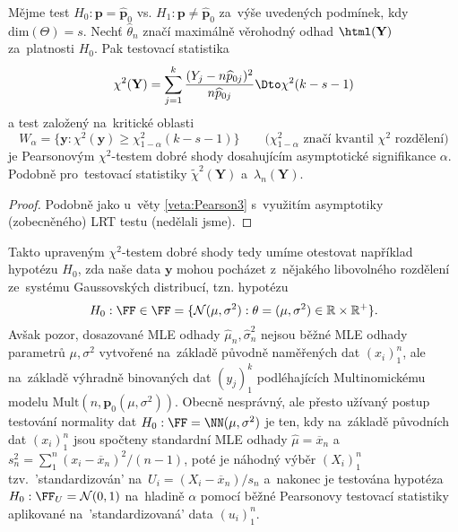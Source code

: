 \begin{theorem}
	Mějme test $ H_0: \mathbf p = \widehat{\mathbf p}_0$ vs. $H_1: \mathbf p \neq \widehat{\mathbf p}_0$ za~výše uvedených podmínek, kdy $\mathrm{dim}(\Theta)=s$. Nechť $\widehat\theta_n$ značí maximálně věrohodný odhad $\html(\mathbf Y)$ za~platnosti $H_0$.
	Pak testovací statistika
	$$\chi^2(\mathbf Y) = \sum_{j=1}^k \frac{(Y_j-n\widehat p_{0j})^2}{n\widehat p_{0j}} \Dto \chi^2(k-s-1)$$
	a test založený na~kritické oblasti
	$$ W_\alpha=\Big\{ \mathbf y: \chi^2(\mathbf y) \geqslant \chi^2_{1-\alpha}(k-s-1)\Big\} \qquad (\chi^2_{1-\alpha}\text{ značí kvantil }\chi^2 \text{ rozdělení)}$$
	je Pearsonovým $\chi^2$-testem dobré shody dosahujícím asymptotické signifikance $\alpha$. Podobně pro~testovací statistiky $\widetilde\chi^2(\mathbf Y)$ a~$\lambda_n(\mathbf Y)$.
\end{theorem}

\begin{proof}
	Podobně jako u~věty \ref{veta:Pearson3} s~využitím asymptotiky (zobecněného) LRT testu (nedělali jsme).
\end{proof}

\begin{remark}
	Takto upraveným $\chi^2$-testem dobré shody tedy umíme otestovat například hypotézu $H_0$, zda naše data $\mathbf y$ mohou pocházet z~nějakého libovolného rozdělení ze~systému Gaussovských distribucí, tzn. hypotézu
	$$ H_0:  \FF \in \mathcal \FF = \{ \mathcal N(\mu, \sigma^2): \theta=(\mu,\sigma^2)\in \mathbb R \times \mathbb{R}^{+}\}.$$ Avšak pozor, dosazované MLE odhady $\widehat \mu_n,\widehat\sigma_n^2$ nejsou běžné MLE odhady parametrů $\mu,\sigma^2$ vytvořené na~základě původně naměřených dat $(x_i)_1^n$, ale na~základě výhradně binovaných dat $(y_j)_1^k$ podléhajících Multinomickému modelu $\mathrm{Mult}(n,\mathbf p_0(\mu, \sigma^2))$. Obecně nesprávný, ale přesto užívaný postup testování normality dat $H_0: \FF=\NN(\mu,\sigma^2)$ je ten, kdy na~základě původních dat $(x_i)_1^n$ jsou spočteny standardní MLE odhady $\widehat\mu=\overline{x}_n$ a~$s_n^2=\sum_1^n(x_i-\overline{x}_n)^2/(n-1)$, poté je náhodný výběr $(X_i)_1^n$ tzv.\ 'standardizován' na~$U_i = (X_i-\overline{x}_n)/ s_n $ a~nakonec je testována hypotéza $H_0: \FF_U= \mathcal N(0,1)$ na~hladině $\alpha$ pomocí běžné Pearsonovy testovací statistiky aplikované na~'standardizovaná' data $(u_i)_1^n$.
\end{remark}

